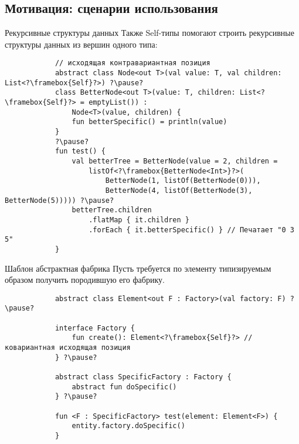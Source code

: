 \documentclass[handout,aspectratio=169,usenames,dvipsnames]{beamer}
\begin{document}
    \subsection{Мотивация: сценарии использования}

    \begin{frame}[fragile]{Рекурсивные структуры данных}
        Также Self-типы помогают строить рекурсивные структуры данных из вершин одного типа:
        \begin{verbatim}
            // исходящая контравариантная позиция
            abstract class Node<out T>(val value: T, val children: List<?\framebox{Self}?>) ?\pause?
            class BetterNode<out T>(value: T, children: List<?\framebox{Self}?> = emptyList()) :
                Node<T>(value, children) {
                fun betterSpecific() = println(value)
            }
            ?\pause?
            fun test() {
                val betterTree = BetterNode(value = 2, children =
                    listOf<?\framebox{BetterNode<Int>}?>(
                        BetterNode(1, listOf(BetterNode(0))),
                        BetterNode(4, listOf(BetterNode(3), BetterNode(5))))) ?\pause?
                betterTree.children
                    .flatMap { it.children }
                    .forEach { it.betterSpecific() } // Печатает "0 3 5"
            }
        \end{verbatim}
    \end{frame}

    \begin{frame}[fragile]{Шаблон абстрактная фабрика}
        Пусть требуется по элементу типизируемым образом получить породившую его фабрику.

        \begin{verbatim}
            abstract class Element<out F : Factory>(val factory: F) ?\pause?

            interface Factory {
                fun create(): Element<?\framebox{Self}?> // ковариантная исходящая позиция
            } ?\pause?

            abstract class SpecificFactory : Factory {
                abstract fun doSpecific()
            } ?\pause?

            fun <F : SpecificFactory> test(element: Element<F>) {
                entity.factory.doSpecific()
            }
        \end{verbatim}
    \end{frame}
\end{document}
